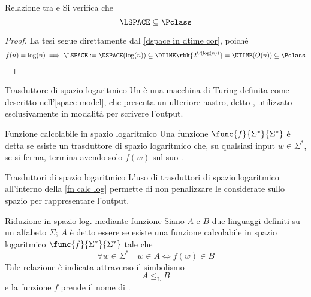 \documentclass[a4paper, 12pt]{report}
\begin{document}
    \begin{framedprop}[label={l in p}]{Relazione tra \LSPACE e \Pclass}
        Si verifica che $$\LSPACE \subseteq \Pclass$$
    \end{framedprop}

    \begin{proof}
        La tesi segue direttamente dal \cref{dspace in dtime cor}, poiché $$f(n) = \log(n) \implies \LSPACE := \DSPACE(\log(n)) \subseteq \DTIME \rbk{2^{O(\log(n))}} = \DTIME(O(n)) \subseteq \Pclass$$
    \end{proof}

    \begin{frameddefn}{Trasduttore di spazio logaritmico}
        Un  è una macchina di Turing definita come descritto nell'\cref{space model}, che presenta un ulteriore nastro, detto , utilizzato esclusivamente in modalità  per scrivere l'output.
    \end{frameddefn}

    \begin{frameddefn}[label={fn calc log}]{Funzione calcolabile in spazio logaritmico}
        Una funzione $\func{f}{\Sigma^*}{\Sigma^*}$ è detta  se esiste un trasduttore di spazio logaritmico che, su qualsiasi input $w \in \Sigma^*$, se si ferma, termina avendo solo $f(w)$ sul suo .
    \end{frameddefn}

    \begin{framedobs}{Trasduttori di spazio logaritmico}
        L'uso di trasduttori di spazio logaritmico all'interno della \cref{fn calc log} permette di non penalizzare le \TM considerate sullo spazio per rappresentare l'output.
    \end{framedobs}

    \begin{frameddefn}{Riduzione in spazio log. mediante funzione}
        Siano $A$ e $B$ due linguaggi definiti su un alfabeto $\Sigma$; $A$ è detto essere  se esiste una funzione calcolabile in spazio logaritmico $\func{f}{\Sigma^*}{\Sigma^*}$  tale che $$\forall w \in \Sigma^* \quad w \in A \iff f(w) \in B$$ Tale relazione è indicata attraverso il simbolismo $$A \leq_\mathrm L B$$ e la funzione $f$ prende il nome di .
    \end{frameddefn}
\end{document}
